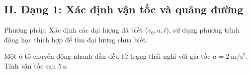 \subsection{II. Dạng 1: Xác định vận tốc và quãng đường}
Phương pháp: Xác định các đại lượng đã biết ($v_0, a, t$), sử dụng phương trình động học thích hợp để tìm đại lượng chưa biết.

\begin{vd}
Một ô tô chuyển động nhanh dần đều từ trạng thái nghỉ với gia tốc $a = 2\ \mathrm{m/s^2}$. Tính vận tốc sau $5\ \mathrm{s}$.
\end{vd}



